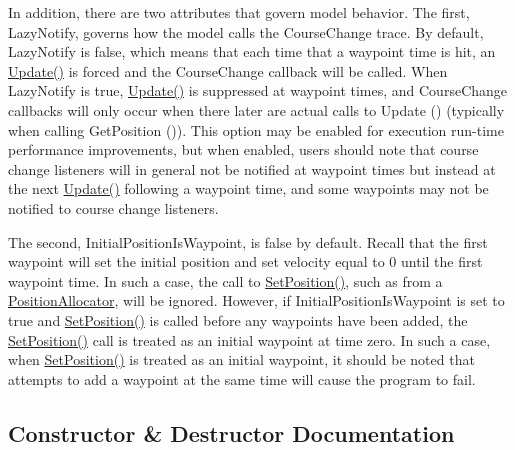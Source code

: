 In addition, there are two attributes that govern model behavior. The first, Lazy\+Notify, governs how the model calls the Course\+Change trace. By default, Lazy\+Notify is false, which means that each time that a waypoint time is hit, an \hyperlink{classns3_1_1WaypointMobilityModel_a243a8be0ea162ae1edfeb4214c5be719}{Update()} is forced and the Course\+Change callback will be called. When Lazy\+Notify is true, \hyperlink{classns3_1_1WaypointMobilityModel_a243a8be0ea162ae1edfeb4214c5be719}{Update()} is suppressed at waypoint times, and Course\+Change callbacks will only occur when there later are actual calls to Update () (typically when calling Get\+Position ()). This option may be enabled for execution run-\/time performance improvements, but when enabled, users should note that course change listeners will in general not be notified at waypoint times but instead at the next \hyperlink{classns3_1_1WaypointMobilityModel_a243a8be0ea162ae1edfeb4214c5be719}{Update()} following a waypoint time, and some waypoints may not be notified to course change listeners.

The second, Initial\+Position\+Is\+Waypoint, is false by default. Recall that the first waypoint will set the initial position and set velocity equal to 0 until the first waypoint time. In such a case, the call to \hyperlink{classns3_1_1MobilityModel_ac584b3d5a309709d2f13ed6ada1e7640}{Set\+Position()}, such as from a \hyperlink{classns3_1_1PositionAllocator}{Position\+Allocator}, will be ignored. However, if Initial\+Position\+Is\+Waypoint is set to true and \hyperlink{classns3_1_1MobilityModel_ac584b3d5a309709d2f13ed6ada1e7640}{Set\+Position()} is called before any waypoints have been added, the \hyperlink{classns3_1_1MobilityModel_ac584b3d5a309709d2f13ed6ada1e7640}{Set\+Position()} call is treated as an initial waypoint at time zero. In such a case, when \hyperlink{classns3_1_1MobilityModel_ac584b3d5a309709d2f13ed6ada1e7640}{Set\+Position()} is treated as an initial waypoint, it should be noted that attempts to add a waypoint at the same time will cause the program to fail. 

\subsection{Constructor \& Destructor Documentation}

